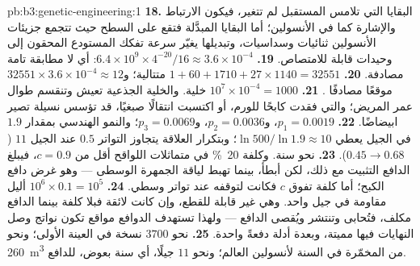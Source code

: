 \begin{solution}{pb:b3:genetic-engineering:1}
\textbf{18.} البقايا التي تلامس المستقبل لم تتغير، فيكون
الارتباط والإشارة كما في الأنسولين؛ أما البقايا المبدَّلة فتقع
على السطح حيث تتجمع جزيئات الأنسولين ثنائيات
وسداسيات، وتبديلها يغيّر سرعة تفكك المستودع المحقون
إلى وحيدات قابلة للامتصاص.
\textbf{19.} $6.4\times 10^{9}\times 4^{-20}/16 \approx 3.6\times
10^{-4}$: أي لا مطابقة تامة مصادفة.
\textbf{20.} $1 + 60 + 1710 + 27\times 1140 = \num{32551}$ متتالية؛
و$\num{32551}\times 3.6\times 10^{-4} \approx 12$ موقعًا مصادفًا .
\textbf{21.} $10^{7}\times 10^{-4} = 1000$ خلية. والخلية الجذعية تعيش
وتنقسم طوال عمر المريض؛ والتي فقدت كابحًا
للورم، أو اكتسبت انتقالًا صبغيًا، قد تؤسس نسيلة تصير
ابيضاضًا.
\textbf{22.} $p_{1} = 0.0019$، و$p_{2} = 0.0036$، و$p_{3} = 0.0069$؛
والنمو الهندسي بمقدار $1.9$ في الجيل يعطي $\ln 500/\ln 1.9
\approx 10$؛ وبتكرار العلاقة يتجاوز التواتر $0.5$ عند
الجيل $11$ ($0.45 \to 0.68$).
\textbf{23.} نحو سنة. وكلفة \qty{20}{\%} في متماثلات اللواقح أقل
من $c = 0.9$، فيبلغ الدافع التثبيت مع ذلك، لكن أبطأ، بينما
تهبط لياقة الجمهرة الوسطى --- وهو غرض دافع الكبح؛ أما
كلفة تفوق $c$ فكانت لتوقفه عند تواتر وسطي.
\textbf{24.} $10^{6}\times 0.1 = 10^{5}$ أليل مقاومة في جيل
واحد. وهي غير قابلة للقطع، وإن كانت لائقة فبلا كلفة بينما الدافع
مكلف، فتُحابى وتنتشر ويُقصى الدافع --- ولهذا
تستهدف الدوافع مواقع تكون نواتج وصل النهايات فيها مميتة، وبعدة
أدلة دفعةً واحدة.
\textbf{25.} نحو $3700$ نسخة في العينة الأولى؛ ونحو \qty{260}{m^3}
من المخمّرة في السنة لأنسولين العالم؛ ونحو $11$ جيلًا، أي سنة
بعوض، للدافع.
\end{solution}
